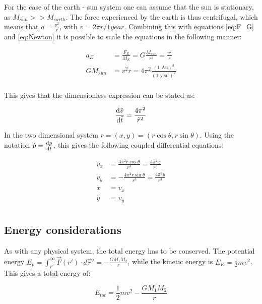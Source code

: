 For the case of the earth - sun system one can assume that the sun is stationary, as $ M_{sun}>> M_{earth} $. The force experienced by the earth is thus centrifugal, which means that $ a = \frac{v^2}{r} $, with $ v = 2\pi r /1year $.  
Combining this with equations \ref{eq:F_G} and \ref{eq:Newton} it is possible to scale the equations in the following manner:

\begin{align}
	{a}_E &= \frac{{F}_E}{M_E}= G\frac{M_{sun}}{r^2} 
= \frac{v^2}{r}\\
	GM_{sun}&= v^2 r = 4\pi^2 \frac{(\text{1 Au})^3}{(\text{1 year})^2}\\
\end{align}

This gives that the dimensionless expression can be stated as: 

	\begin{equation}
		\dv{\tilde{v}}{\tilde{t}} = \frac{4\pi^2}{\tilde{r}^2} 
	\end{equation}
	
In the two dimensional system $ r = (x,y) = (r\cos\theta, r\sin\theta) $. Using the notation $ 	\dot{p}  = \dv{p}{t}$, this gives the following coupled differential equations: 

\begin{align}
\dot{v}_x  &=  \frac{4\pi^2r\cos\theta}{{r}^3}  = \frac{4\pi^2x}{{r}^3}  \label{eq:vx}\\
\dot{v}_y	 &= -\frac{4\pi^2r\sin\theta}{{r}^3}  = \frac{4\pi^2y}{{r}^3 \label{eq:vy}}\\
	\dot{x}  &= v_x \label{eq:x}\\
	\dot{y}  &= v_y \label{eq:y}\\
\end{align}

\subsection{Energy considerations}

As with any physical system, the total energy has to be conserved. The potential energy $ E_p = \int_{r'}^{\infty} \vec{F}(r') \cdot  d\vec{r}' = -\frac{G	M_1M_2}{r} $, while the kinetic energy is $ E_K  = \frac{1}{2}mv^2$. This gives a total energy of:

\begin{equation}
	E_{tot} = \frac{1}{2}mv^2 - \frac{G	M_1M_2}{r} \label{eq: toten}
\end{equation}

